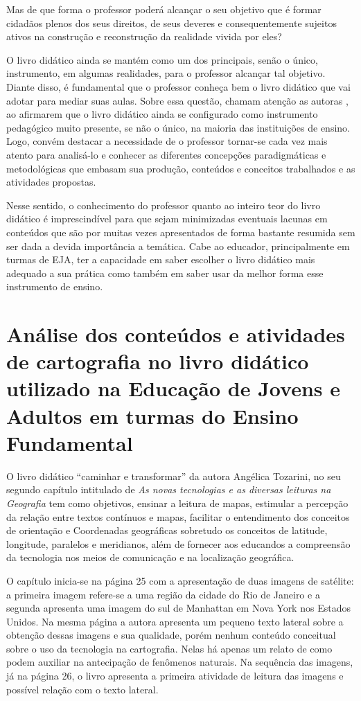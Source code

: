 \begin{refsection}
    Mas de que forma o professor poderá alcançar o seu objetivo que é formar cidadãos plenos dos seus direitos, de seus deveres e consequentemente sujeitos ativos na construção e reconstrução da realidade vivida por eles?  

    O livro didático ainda se mantém como um dos principais, senão o único, instrumento, em algumas realidades, para o professor alcançar tal objetivo. Diante disso, é fundamental que o professor conheça bem o livro didático que vai adotar para mediar suas aulas. Sobre essa questão, chamam atenção as autoras \textcite{SILVAAndSILVA2009abordagem}, ao afirmarem que o livro didático ainda se configurado como instrumento pedagógico muito presente, se não o único, na maioria das instituições de ensino. Logo, convém destacar a necessidade de o professor tornar-se cada vez mais atento para analisá-lo e conhecer as diferentes concepções paradigmáticas e metodológicas que embasam sua produção, conteúdos e conceitos trabalhados e as atividades propostas.  

    Nesse sentido, o conhecimento do professor quanto ao inteiro teor do livro didático é imprescindível para que sejam minimizadas eventuais lacunas em conteúdos que são por muitas vezes apresentados de forma bastante resumida sem ser dada a devida importância a temática. Cabe ao educador, principalmente em turmas de EJA, ter a capacidade em saber escolher o livro didático mais adequado a sua prática como também em saber usar da melhor forma esse instrumento de ensino. 


    \section{Análise dos conteúdos e atividades de cartografia no livro didático utilizado na Educação de Jovens e Adultos em turmas do Ensino Fundamental}

    O livro didático “caminhar e transformar” da autora Angélica Tozarini, no seu segundo capítulo intitulado de \textit{As novas tecnologias e as diversas leituras na Geografia} tem como objetivos, ensinar a leitura de mapas, estimular a percepção da relação entre textos contínuos e mapas, facilitar o entendimento dos conceitos de orientação e Coordenadas geográficas sobretudo os conceitos de latitude, longitude, paralelos e meridianos, além de fornecer aos educandos a compreensão da tecnologia nos meios de comunicação e na localização geográfica. 

    O capítulo inicia-se na página 25 com a apresentação de duas imagens de satélite: a primeira imagem refere-se a uma região da cidade do Rio de Janeiro e a segunda apresenta uma imagem do sul de Manhattan em Nova York nos Estados Unidos. Na mesma página a autora apresenta um pequeno texto lateral sobre a obtenção dessas imagens e sua qualidade, porém nenhum conteúdo conceitual sobre o uso da tecnologia na cartografia. Nelas há apenas um relato de como podem auxiliar na antecipação de fenômenos naturais. Na sequência das imagens, já na página 26, o livro apresenta a primeira atividade de leitura das imagens e possível relação com o texto lateral.  


\end{refsection}
